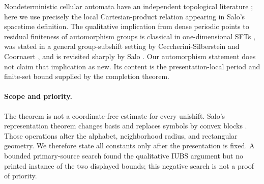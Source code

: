 Nondeterministic cellular automata have an independent topological literature \citep{dilena2014}; here we use precisely the local Cartesian-product relation appearing in Salo's spacetime definition.  The qualitative implication from dense periodic points to residual finiteness of automorphism groups is classical in one-dimensional SFTs \citep{boyle1988}, was stated in a general group-subshift setting by Ceccherini-Silberstein and Coornaert \citep{ceccherini2012}, and is revisited sharply by Salo \citep{salo2026residual}.  Our automorphism statement does not claim that implication as new.  Its content is the presentation-local period and finite-set bound supplied by the completion theorem.

\paragraph{Scope and priority.}
The theorem is not a coordinate-free estimate for every unishift.  Salo's representation theorem changes basis and replaces symbols by convex blocks \citep[Theorem~1 and Lemma~27]{salo2025iubs}.  Those operations alter the alphabet, neighborhood radius, and rectangular geometry.  We therefore state all constants only after the presentation is fixed.  A bounded primary-source search found the qualitative IUBS argument but no printed instance of the two displayed bounds; this negative search is not a proof of priority.
